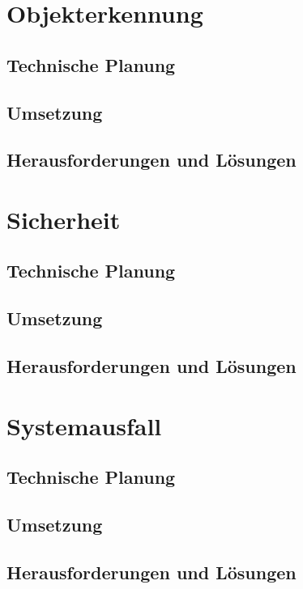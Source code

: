 \section{Objekterkennung}

  \subsection{Technische Planung}

  \subsection{Umsetzung}

  \subsection{Herausforderungen und Lösungen}

\section{Sicherheit}

  \subsection{Technische Planung}

  \subsection{Umsetzung}

  \subsection{Herausforderungen und Lösungen}

\section{Systemausfall}

  \subsection{Technische Planung}

  \subsection{Umsetzung}

  \subsection{Herausforderungen und Lösungen}

